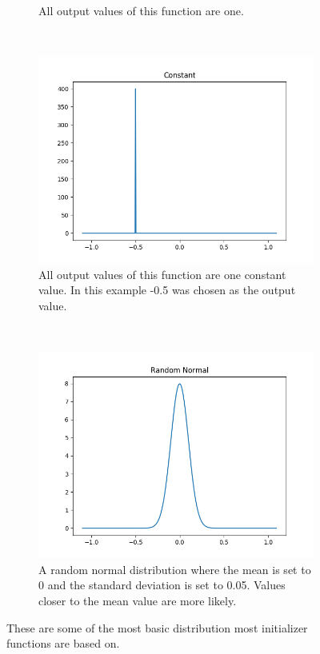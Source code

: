 \begin{figure}[h!]
\begin{subfigure}[t]{0.4\textwidth}
		\caption{All output values of this function are one.}
	\end{subfigure}
	~
	\begin{subfigure}[t]{0.4\textwidth}
		\centering
		\includegraphics[width=\textwidth]{img/methodology_neuralNetwork_initializerFunctions_constant.png}
		\caption{All output values of this function are one constant value. In this example -0.5 was chosen as the output value.}
	\end{subfigure}%
	~ 
	\begin{subfigure}[t]{0.4\textwidth}
		\centering
		\includegraphics[width=\textwidth]{img/methodology_neuralNetwork_initializerFunctions_randomNormal.png}
		\caption{A random normal distribution where the mean is set to 0 and the standard deviation is set to 0.05. Values closer to the mean value are more likely.}
	\end{subfigure}
	\caption{These are some of the most basic distribution most initializer functions are based on.}
	\label{pic:methodology_neuralNetwork_initializerFunctions1}
\end{figure}

